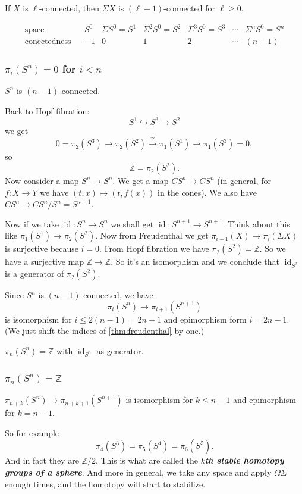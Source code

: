 \begin{coro}
	If $X$ is $\ell$-connected, then $\Sigma X$ is $(\ell+1)$-connected for $\ell\geq0$.
\end{coro}
\[\begin{matrix}
	\text{space}&&S^0&\Sigma S^0=S^1&\Sigma^2S^0=S^2&\Sigma^3S^0=S^3&\cdots&\Sigma^nS^0=S^n\\
	\text{conectedness}&&-1&0&1&2&\cdots&(n-1)
\end{matrix}\]

\subsubsection{\texorpdfstring{$\pi_{i}(S^{n})=0$}{πᵢ(Sⁿ)} for \texorpdfstring{$i<n$}{i<n}}

\begin{coro}
	$S^n$ is $(n-1)$-connected.
\end{coro}
Back to Hopf fibration:
\[S^1\hookrightarrow S^3\to S^2\]
we get
\[0=\pi_2(S^3)\to\pi_2(S^2)\overset{\cong}{\to}\pi_1(S^1)\to\pi_1(S^3)=0,\]
so
\[\mathbb{Z}=\pi_2(S^2).\]
Now consider a map $S^n\to S^n$. We get a map $CS^n\to CS^n$ (in general, for $f:X\to Y$ we have $(t,x)\mapsto(t,f(x))$ in the cones). We also have $CS^n\to CS^n/S^n=S^{n+1}$.

Now if we take $\operatorname{id}:S^n\to S^n$ we shall get $\operatorname{id}:S^{n+1}\to S^{n+1}$. Think about this like $\pi_1(S^1)\to\pi_2(S^2)$. Now from Freudenthal we get $\pi_{i-1}(X)\to\pi_i(\Sigma X)$ is surjective because $i=0$. From Hopf fibration we have $\pi_2(S^2)=\mathbb{Z}$. So we have a surjective map $\mathbb{Z}\to\mathbb{Z}$. So it's an isomorphism and we conclude that $\operatorname{id}_{S^2}$ is a generator of $\pi_2(S^2)$.
\begin{coro}
	Since $S^n$ is $(n-1)$-connected, we have
	\[\pi_i(S^n)\to\pi_{i+1}(S^{n+1})\]
	is isomorphism for $i\leq 2(n-1)=2n-1$ and epimorphism form $i=2n-1$. (We just shift the indices of \cref{thm:freudenthal} by one.)
\end{coro}
\begin{coro}
	$\pi_n(S^n)=\mathbb{Z}$ with $\operatorname{id}_{S^n}$ as generator.
\end{coro}

\subsubsection{$\pi_{n}(S^{n})=\mathbb{Z}$}
\begin{coro}
	$\pi_{n+k}(S^n)\to\pi_{n+k+1}(S^{n+1})$ is isomorphism for $k\leq n-1$ and epimorphism for $k=n-1$.
\end{coro}
So for example
\[\pi_4(S^3)=\pi_5(S^4)=\pi_6(S^5).\]
And in fact they are $\mathbb{Z}/2$. This is what are called the \textbf{\textit{$k$th stable homotopy groups of a sphere}}. And more in general, we take any space and apply $\Omega\Sigma$ enough times, and the homotopy will start to stabilize.

